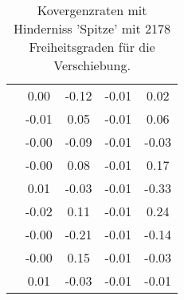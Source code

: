 \begin{table}
\begin{tabular}{c|cc|cc|}
\multicolumn{1}{|c|}{} & \multicolumn{1}{|c|}{      0.00} & \multicolumn{1}{|c|}{     -0.12} & \multicolumn{1}{|c|}{     -0.01} & \multicolumn{1}{|c|}{      0.02} \\ 
\multicolumn{1}{|c|}{} & \multicolumn{1}{|c|}{     -0.01} & \multicolumn{1}{|c|}{      0.05} & \multicolumn{1}{|c|}{     -0.01} & \multicolumn{1}{|c|}{      0.06} \\ 
\multicolumn{1}{|c|}{} & \multicolumn{1}{|c|}{     -0.00} & \multicolumn{1}{|c|}{     -0.09} & \multicolumn{1}{|c|}{     -0.01} & \multicolumn{1}{|c|}{     -0.03} \\ 
\multicolumn{1}{|c|}{} & \multicolumn{1}{|c|}{     -0.00} & \multicolumn{1}{|c|}{      0.08} & \multicolumn{1}{|c|}{     -0.01} & \multicolumn{1}{|c|}{      0.17} \\ 
\multicolumn{1}{|c|}{} & \multicolumn{1}{|c|}{      0.01} & \multicolumn{1}{|c|}{     -0.03} & \multicolumn{1}{|c|}{     -0.01} & \multicolumn{1}{|c|}{     -0.33} \\ 
\multicolumn{1}{|c|}{} & \multicolumn{1}{|c|}{     -0.02} & \multicolumn{1}{|c|}{      0.11} & \multicolumn{1}{|c|}{     -0.01} & \multicolumn{1}{|c|}{      0.24} \\ 
\multicolumn{1}{|c|}{} & \multicolumn{1}{|c|}{     -0.00} & \multicolumn{1}{|c|}{     -0.21} & \multicolumn{1}{|c|}{     -0.01} & \multicolumn{1}{|c|}{     -0.14} \\ 
\multicolumn{1}{|c|}{} & \multicolumn{1}{|c|}{     -0.00} & \multicolumn{1}{|c|}{      0.15} & \multicolumn{1}{|c|}{     -0.01} & \multicolumn{1}{|c|}{     -0.03} \\ 
\multicolumn{1}{|c|}{} & \multicolumn{1}{|c|}{      0.01} & \multicolumn{1}{|c|}{     -0.03} & \multicolumn{1}{|c|}{     -0.01} & \multicolumn{1}{|c|}{     -0.01} \\ 
\hline 
\end{tabular}\caption{Kovergenzraten mit Hinderniss 'Spitze' mit 2178 Freiheitsgraden für die Verschiebung.}\label{tab:Rate_Spitze_level4}
\end{table} 
